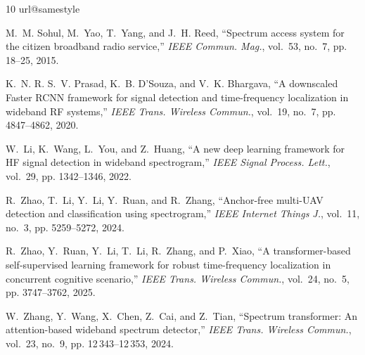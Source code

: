 \documentclass[journal]{IEEEtran}
\begin{document}
{\small
\begin{thebibliography}{10}
\providecommand{\url}[1]{#1}
\csname url@samestyle\endcsname
\providecommand{\newblock}{\relax}
\providecommand{\bibinfo}[2]{#2}
\providecommand{\BIBentrySTDinterwordspacing}{\spaceskip=0pt\relax}
\providecommand{\BIBentryALTinterwordstretchfactor}{4}
\providecommand{\BIBentryALTinterwordspacing}{\spaceskip=\fontdimen2\font plus
\BIBentryALTinterwordstretchfactor\fontdimen3\font minus
  \fontdimen4\font\relax}
\providecommand{\BIBforeignlanguage}[2]{{%
\expandafter\ifx\csname l@#1\endcsname\relax
\typeout{** WARNING: IEEEtran.bst: No hyphenation pattern has been}%
\typeout{** loaded for the language `#1'. Using the pattern for}%
\typeout{** the default language instead.}%
\else
\language=\csname l@#1\endcsname
\fi
#2}}
\providecommand{\BIBdecl}{\relax}
\BIBdecl

M.~M. Sohul, M.~Yao, T.~Yang, and J.~H. Reed, ``Spectrum access system for the
  citizen broadband radio service,'' \emph{IEEE Commun. Mag.}, vol.~53, no.~7,
  pp. 18--25, 2015.

K.~N. R. S.~V. Prasad, K.~B. D'Souza, and V.~K. Bhargava, ``A downscaled
  {Faster RCNN} framework for signal detection and time-frequency localization
  in wideband {RF} systems,'' \emph{IEEE Trans. Wireless Commun.}, vol.~19,
  no.~7, pp. 4847--4862, 2020.

W.~Li, K.~Wang, L.~You, and Z.~Huang, ``A new deep learning framework for {HF}
  signal detection in wideband spectrogram,'' \emph{IEEE Signal Process.
  Lett.}, vol.~29, pp. 1342--1346, 2022.

R.~Zhao, T.~Li, Y.~Li, Y.~Ruan, and R.~Zhang, ``Anchor-free multi-{UAV}
  detection and classification using spectrogram,'' \emph{IEEE Internet Things
  J.}, vol.~11, no.~3, pp. 5259--5272, 2024.

R.~Zhao, Y.~Ruan, Y.~Li, T.~Li, R.~Zhang, and P.~Xiao, ``A transformer-based
  self-supervised learning framework for robust time-frequency localization in
  concurrent cognitive scenario,'' \emph{IEEE Trans. Wireless Commun.},
  vol.~24, no.~5, pp. 3747--3762, 2025.

W.~Zhang, Y.~Wang, X.~Chen, Z.~Cai, and Z.~Tian, ``Spectrum transformer: An
  attention-based wideband spectrum detector,'' \emph{IEEE Trans. Wireless
  Commun.}, vol.~23, no.~9, pp. 12\,343--12\,353, 2024.


\end{thebibliography}}
\end{document}
